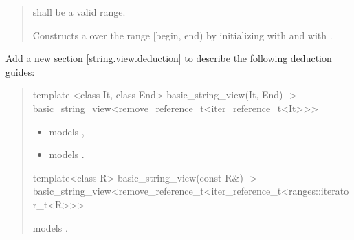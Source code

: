 \documentclass{wg21}
\begin{document}
\begin{quote}
\begin{addedblock}
\begin{itemdescr}
    \expects
     shall be a valid range.

    \effects
    Constructs a  over the range [begin, end) by initializing  with  and  with .

\end{itemdescr}
\end{addedblock}
\end{quote}


Add a new section [string.view.deduction] to describe the following deduction guides:



\begin{quote}
\begin{addedblock}
\begin{itemdecl}
template <class It, class End>
basic_string_view(It, End) -> basic_string_view<remove_reference_t<iter_reference_t<It>>>
\end{itemdecl}
\begin{itemdescr}
    \constraints
    \begin{itemize}
        \item {} models ,
        \item {} models .
    \end{itemize}
\end{itemdescr}

\begin{itemdecl}
template<class R>
basic_string_view(const R&)
-> basic_string_view<remove_reference_t<iter_reference_t<ranges::iterator_t<R>>>
\end{itemdecl}
\begin{itemdescr}
    \constraints {} models .
\end{itemdescr}

\end{addedblock}
\end{quote}
\end{document}
